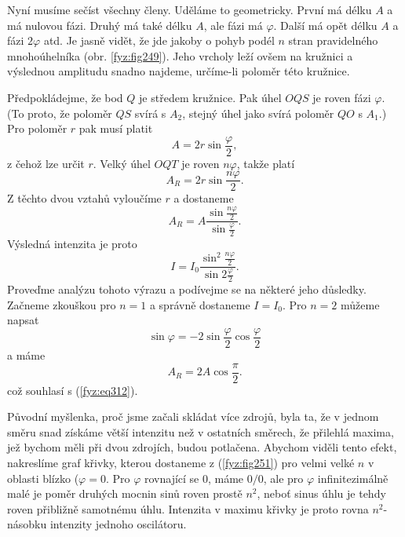     Nyní musíme sečíst všechny členy. Uděláme to geometricky. První má délku \(A\) a má nulovou 
    fázi. Druhý má také délku \(A\), ale fázi má \(\varphi\). Další má opět délku \(A\) a fázi
    \(2\varphi\) atd. Je jasně vidět, že jde jakoby o pohyb podél \(n\) stran pravidelného 
    mnohoúhelníka (obr. \ref{fyz:fig249}). Jeho vrcholy leží ovšem na kružnici a výslednou 
    amplitudu snadno najdeme, určíme-li poloměr této kružnice.
    
    Předpokládejme, že bod \(Q\) je středem kružnice. Pak úhel \(OQS\) je roven fázi \(\varphi\). 
    (To proto, že poloměr \(QS\) svírá s \(A_2\), stejný úhel jako svírá poloměr \(QO\) s \(A_1\).) 
    Pro poloměr \(r\) pak musí platit
    \begin{equation}\label{fyz:eq317}
      A = 2r\sin\frac{\varphi}{2},
    \end{equation}
    z čehož lze určit \(r\). Velký úhel \(OQT\) je roven \(n\varphi\), takže platí
    \begin{equation}\label{fyz:eq318}
      A_R = 2r\sin\frac{n\varphi}{2}.
    \end{equation}
    Z těchto dvou vztahů vyloučíme \(r\) a dostaneme 
    \begin{equation}\label{fyz:eq319}
      A_R = A\dfrac{\sin\frac{n\varphi}{2}}{\sin\frac{\varphi}{2}}.
    \end{equation}
    Výsledná intenzita je proto
    \begin{equation}\label{fyz:eq320}
      I = I_0\dfrac{\sin^2\frac{n\varphi}{2}}{\sin2\frac{\varphi}{2}}.
    \end{equation}
    Proveďme analýzu tohoto výrazu a podívejme se na některé jeho důsledky. Začneme zkouškou pro 
    \(n = 1\) a správně dostaneme \(I = I_0\). Pro \(n = 2\) můžeme napsat 
    \begin{equation*}
      \sin\varphi = -2\sin\frac{\varphi}{2}\cos\frac{\varphi}{2}
    \end{equation*}
    a máme
    \begin{equation*}
      A_R = 2A\cos\frac{\pi}{2}.
    \end{equation*}
    což souhlasí s (\ref{fyz:eq312}).
    
    Původní myšlenka, proč jsme začali skládat více zdrojů, byla ta, že v jednom směru snad získáme 
    větší intenzitu než v ostatních směrech, že přilehlá maxima, jež bychom měli při dvou zdrojích, 
    budou potlačena. Abychom viděli tento efekt, nakreslíme graf křivky, kterou dostaneme z 
    (\ref{fyz:fig251}) pro velmi velké \(n\) v oblasti blízko (\(\varphi = 0\). Pro \(\varphi\) 
    rovnající se \(0\), máme \(0/0\), ale pro \(\varphi\) infinitezimálně malé je poměr druhých 
    mocnin sinů roven prostě \(n^2\), neboť sinus úhlu je tehdy roven přibližně samotnému úhlu. 
    Intenzita v maximu křivky je proto rovna \(n^2\)-násobku intenzity jednoho oscilátoru.
     

